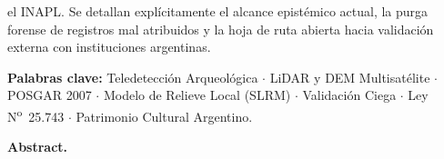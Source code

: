 \documentclass[11pt,a4paper]{article}
\DeclareRobustCommand{\_}{\ifmmode\mbox{\textunderscore}\else\textunderscore\allowbreak\fi}
\begin{document}
\begin{tcolorbox}[colback=slatebg,colframe=navy,boxrule=0.7pt,arc=2pt,left=8pt,right=8pt,top=6pt,bottom=6pt]
el INAPL. Se detallan expl\'icitamente el alcance epist\'emico actual, la purga forense de registros mal atribuidos y la hoja de ruta abierta hacia validaci\'on externa con instituciones argentinas.

\vspace{4pt}
\noindent\textbf{\color{navy}Palabras clave:} Teledetecci\'on Arqueol\'ogica $\cdot$ LiDAR y DEM Multisat\'elite $\cdot$ POSGAR 2007 $\cdot$ Modelo de Relieve Local (SLRM) $\cdot$ Validaci\'on Ciega $\cdot$ Ley N\textsuperscript{o}~25.743 $\cdot$ Patrimonio Cultural Argentino.
\end{tcolorbox}

\begin{tcolorbox}[colback=slatebg,colframe=tealaccent!80!black,boxrule=0.6pt,arc=2pt,left=8pt,right=8pt,top=5pt,bottom=5pt]
\small
\textbf{\color{navy}Abstract.}

\end{tcolorbox}
\end{document}
